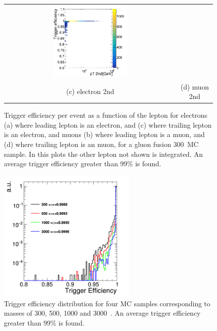 \begin{figure}[htbp]
\begin{tabular}{cc}
 \includegraphics[width=0.45\textwidth]{../AN/Figs/Trigger/mu2.png} \\
 (c) electron 2nd & (d) muon 2nd \\
\end{tabular}
\caption{
      Trigger efficiency per event
      as a function of the lepton \pt
      for electrons (a) where leading lepton is an electron, 
      and (c) where trailing lepton is an electron, 
      and muons (b) where leading lepton is a muon, 
      and (d) where trailing lepton is an muon, 
      for a gluon fusion 300~\GeV MC sample.
      In this plots the other lepton not shown is
      integrated.
      An average trigger efficiency greater than 99\% is found.      
     }
    \label{Fig:trigger}
\end{figure}
\begin{figure}[htbp]
\centering
 \includegraphics[width=0.6\textwidth]{../AN/Figs/Trigger/triggW.png}
\caption{
      Trigger efficiency distribution for 
      four MC samples corresponding to masses of 300, 500, 1000 and 3000~\GeV.
      An average trigger efficiency greater than 99\% is found.
     }
    \label{Fig:triggerIntegral}
\end{figure}


